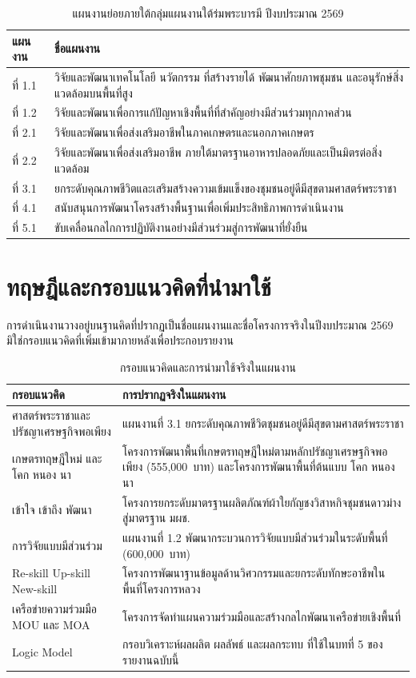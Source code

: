 \begin{table}[H]
\centering
\caption{แผนงานย่อยภายใต้กลุ่มแผนงานใต้ร่มพระบารมี ปีงบประมาณ 2569}
\small
\begin{tabular}{L{1.8cm}L{12.0cm}}
\toprule
{}
\textbf{แผนงาน} & \textbf{ชื่อแผนงาน}\\
\midrule
ที่ 1.1 & วิจัยและพัฒนาเทคโนโลยี นวัตกรรม ที่สร้างรายได้ พัฒนาศักยภาพชุมชน และอนุรักษ์สิ่งแวดล้อมบนพื้นที่สูง\\
ที่ 1.2 & วิจัยและพัฒนาเพื่อการแก้ปัญหาเชิงพื้นที่ที่สำคัญอย่างมีส่วนร่วมทุกภาคส่วน\\
ที่ 2.1 & วิจัยและพัฒนาเพื่อส่งเสริมอาชีพในภาคเกษตรและนอกภาคเกษตร\\
ที่ 2.2 & วิจัยและพัฒนาเพื่อส่งเสริมอาชีพ ภายใต้มาตรฐานอาหารปลอดภัยและเป็นมิตรต่อสิ่งแวดล้อม\\
ที่ 3.1 & ยกระดับคุณภาพชีวิตและเสริมสร้างความเข้มแข็งของชุมชนอยู่ดีมีสุขตามศาสตร์พระราชา\\
ที่ 4.1 & สนับสนุนการพัฒนาโครงสร้างพื้นฐานเพื่อเพิ่มประสิทธิภาพการดำเนินงาน\\
ที่ 5.1 & ขับเคลื่อนกลไกการปฏิบัติงานอย่างมีส่วนร่วมสู่การพัฒนาที่ยั่งยืน\\
\bottomrule
\end{tabular}
\end{table}

\section{ทฤษฎีและกรอบแนวคิดที่นำมาใช้}
การดำเนินงานวางอยู่บนฐานคิดที่ปรากฏเป็นชื่อแผนงานและชื่อโครงการจริงในปีงบประมาณ 2569
มิใช่กรอบแนวคิดที่เพิ่มเข้ามาภายหลังเพื่อประกอบรายงาน

\begin{table}[H]
\centering
\caption{กรอบแนวคิดและการนำมาใช้จริงในแผนงาน}
\small
\begin{tabular}{L{4.2cm}L{9.6cm}}
\toprule
{}
\textbf{กรอบแนวคิด} & \textbf{การปรากฏจริงในแผนงาน}\\
\midrule
ศาสตร์พระราชาและปรัชญาเศรษฐกิจพอเพียง & แผนงานที่ 3.1 ยกระดับคุณภาพชีวิตชุมชนอยู่ดีมีสุขตามศาสตร์พระราชา\\
เกษตรทฤษฎีใหม่ และ โคก หนอง นา & โครงการพัฒนาพื้นที่เกษตรทฤษฎีใหม่ตามหลักปรัชญาเศรษฐกิจพอเพียง (555,000~บาท) และโครงการพัฒนาพื้นที่ต้นแบบ โคก หนอง นา\\
เข้าใจ เข้าถึง พัฒนา & โครงการยกระดับมาตรฐานผลิตภัณฑ์ผ้าใยกัญชงวิสาหกิจชุมชนดาวม่างสู่มาตรฐาน มผช.\\
การวิจัยแบบมีส่วนร่วม & แผนงานที่ 1.2 พัฒนากระบวนการวิจัยแบบมีส่วนร่วมในระดับพื้นที่ (600,000~บาท)\\
Re-skill Up-skill New-skill & โครงการพัฒนาฐานข้อมูลด้านวิศวกรรมและยกระดับทักษะอาชีพในพื้นที่โครงการหลวง\\
เครือข่ายความร่วมมือ MOU และ MOA & โครงการจัดทำแผนความร่วมมือและสร้างกลไกพัฒนาเครือข่ายเชิงพื้นที่\\
Logic Model & กรอบวิเคราะห์ผลผลิต ผลลัพธ์ และผลกระทบ ที่ใช้ในบทที่ 5 ของรายงานฉบับนี้\\
\bottomrule
\end{tabular}
\end{table}


